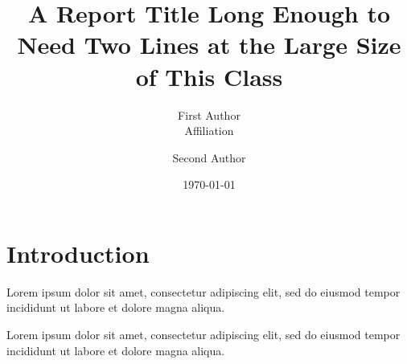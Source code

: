 \documentclass{report}
\title{A Report Title Long Enough to Need Two Lines at the Large Size of This Class}
\author{First Author \\ Affiliation \and Second Author}
\date{\today}
\begin{document}
\maketitle
\chapter{Introduction}
Lorem ipsum dolor sit amet, consectetur adipiscing elit, sed do eiusmod tempor incididunt ut labore et dolore magna aliqua.

Lorem ipsum dolor sit amet, consectetur adipiscing elit, sed do eiusmod tempor incididunt ut labore et dolore magna aliqua.
\end{document}

